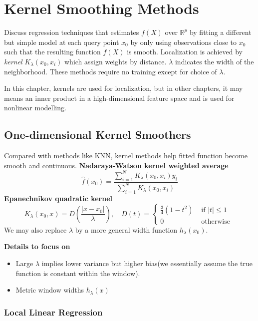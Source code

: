 \chapter{Kernel Smoothing Methods}
Discuss regression techniques that estimates $f(X)$ over $\mathbb{R}^p$ by fitting a different
but simple model at each query point $x_0$ by only using observations close to $x_0$ such that
the resulting function $\hat{f}(X)$ is smooth. Localization is achieved by \textit{kernel} 
$K_{\lambda}(x_0,x_i)$ which assign weights by distance. $\lambda$ indicates the width of the
neighborhood. These methods require no training except for choice of $\lambda$. 

In this chapter, kernels are used for localization, but in other chapters, it may means an 
inner product in a high-dimensional feature space and is used for nonlinear modelling. 

\section{One-dimensional Kernel Smoothers}
Compared with methods like KNN, kernel methods help fitted function become smooth and continuous. 
\noindent\textbf{Nadaraya-Watson kernel weighted average}
\begin{equation*}
    \hat{f}\left(x_{0}\right)=\frac{\sum_{i=1}^{N} K_{\lambda}\left(x_{0}, x_{i}\right) 
    y_{i}}{\sum_{i=1}^{N} K_{\lambda}\left(x_{0}, x_{i}\right)}
\end{equation*}
\noindent\textbf{Epanechnikov quadratic kernel}
\begin{equation*}
    K_{\lambda}\left(x_{0}, x\right)=D\left(\frac{\left|x-x_{0}\right|}{\lambda}\right),\quad
D(t)=\left\{\begin{array}{ll}{\frac{3}{4}\left(1-t^{2}\right)} & {\text { if }|t| \leq 1} \\ 
{0} & {\text { otherwise }}\end{array}\right.
\end{equation*}
We may also replace $\lambda$ by a more general width function $h_{\lambda}(x_0)$. 

\noindent\textbf{Details to focus on}
\begin{itemize}
\item Large $\lambda$ implies lower variance but higher bias(we essentially assume
the true function is constant within the window). 
\item Metric window widths $h_\lambda(x)$
\end{itemize}

\subsection{Local Linear Regression}